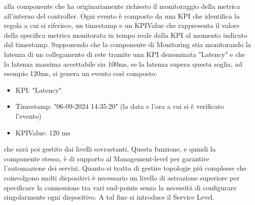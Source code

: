 alla componente che ha
originariamente richiesto il monitoraggio della metrica all'interno del controller.
\newline Ogni evento è composto da una KPI che identifica la regola a cui si riferisce, un timestamp e un KPIValue che rappresenta il valore della specifica metrica monitorata in tempo reale dalla KPI al momento indicato dal timestamp.
Supponendo che la componente di Monitoring stia monitorando la latenza di un collegamento di rete tramite una KPI denominata "Latency" e che la latenza massima accettabile sia 100ms,
se la latenza supera questa soglia, ad esempio 120ms, si genera un evento così composto: 
\begin{itemize}
    \item KPI: "Latency"
    \item Timestamp: "06-09-2024 14:35:20" (la data e l'ora a cui si è verificato l'evento)
    \item KPIValue: 120 ms
\end{itemize}
che sarà poi gestito dai livelli sovrastanti.
Questa funzione, e quindi la componente stessa, è di supporto al Management-level per garantire l'automazione dei servizi.
Quanto si tratta di gestire topologie più complesse che coinvolgono molti dispositivi è necessario un livello di astrazione superiore per specificare la connessione tra vari end-points
senza la necessità di configurare singolarmente ogni dispositivo. 
A tal fine si introduce il Service Level. 

